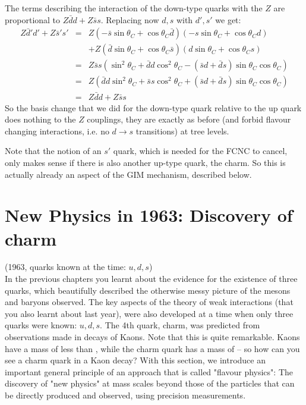  The terms describing the interaction of the down-type quarks with the $Z$ are proportional to $Z\bar{d}d + Z\bar{s}s$. Replacing now $d, s$ with $d', s'$ we get:
\begin{eqnarray}
 Z\bar{d}'d' + Z\bar{s}'s'
&=&
 Z\left(-\bar{s}\sin\theta_C + \cos\theta_C \bar{d}\right)
 \left(-s\sin\theta_C + \cos\theta_C d\right)
\nonumber\\
&&+
 Z\left( \bar{d}\sin\theta_C + \cos\theta_C \bar{s}\right)
 \left( d\sin\theta_C + \cos\theta_C s\right)
\nonumber\\
&=&
  Z\bar{s}s \left(\sin^2\theta_C + \bar{d}d \cos^2\theta_C
- (\bar{s}d + \bar{d}s) \sin\theta_C\cos\theta_C\right)
\nonumber\\
&=&
  Z\left(\bar{d}d \sin^2\theta_C + \bar{s}s \cos^2\theta_C
+ (\bar{s}d + \bar{d}s) \sin\theta_C\cos\theta_C\right)
\nonumber\\
&=& Z\bar{d}d + Z\bar{s}s 
\end{eqnarray}
So the basis change that we did for the down-type quark relative to the up quark does nothing to the $Z$ couplings, they are exactly as before (and forbid flavour changing interactions, i.e. no $d \to s$ transitions) at tree levels.

Note that the notion of an $s'$ quark, which is needed for the FCNC to cancel, only makes sense if there is also another up-type quark, the charm. So this is actually already an aspect of the GIM mechanism, described below.

\section{New Physics in 1963: Discovery of charm}
 (1963, quarks known at the time: $u, d, s$)\\ 
 In the previous chapters you learnt about the evidence for the existence of three quarks, which beautifully described the otherwise messy picture of the mesons and baryons observed. The key aspects of the theory of weak interactions (that you also learnt about last year), were also developed at a time when only three quarks were known: $u, d, s$. The 4th quark, charm, was predicted from observations made in decays of Kaons. Note that this is quite remarkable. Kaons have a mass of less than , while the charm quark has a mass of  -- so how can you see a charm quark in a Kaon decay? With this section, we introduce an important general principle of an approach that is called "flavour physics": The discovery of "new physics" at mass scales beyond those of the particles that can be directly produced and observed, using precision measurements.


